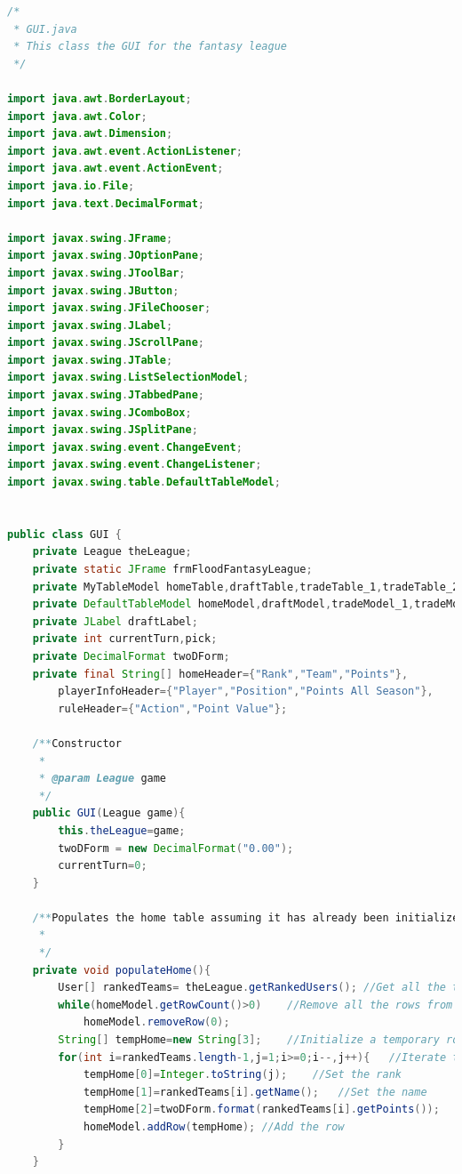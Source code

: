 \documentclass[12pt]{report}
\begin{document}
\begin{singlespace}
\begin{lstlisting}[language=Java,label=some-code,caption={GUI.java}]
/*
 * GUI.java
 * This class the GUI for the fantasy league
 */

import java.awt.BorderLayout;
import java.awt.Color;
import java.awt.Dimension;
import java.awt.event.ActionListener;
import java.awt.event.ActionEvent;
import java.io.File;
import java.text.DecimalFormat;

import javax.swing.JFrame;
import javax.swing.JOptionPane;
import javax.swing.JToolBar;
import javax.swing.JButton;
import javax.swing.JFileChooser;
import javax.swing.JLabel;
import javax.swing.JScrollPane;
import javax.swing.JTable;
import javax.swing.ListSelectionModel;
import javax.swing.JTabbedPane;
import javax.swing.JComboBox;
import javax.swing.JSplitPane;
import javax.swing.event.ChangeEvent;
import javax.swing.event.ChangeListener;
import javax.swing.table.DefaultTableModel;


public class GUI {
	private League theLeague;
	private static JFrame frmFloodFantasyLeague;
	private MyTableModel homeTable,draftTable,tradeTable_1,tradeTable_2,dropTable,ruleTable;
	private DefaultTableModel homeModel,draftModel,tradeModel_1,tradeModel_2,dropModel,ruleModel;
	private JLabel draftLabel;
	private int currentTurn,pick;
	private DecimalFormat twoDForm;
	private final String[] homeHeader={"Rank","Team","Points"},
		playerInfoHeader={"Player","Position","Points All Season"},
		ruleHeader={"Action","Point Value"};
	
	/**Constructor
	 * 
	 * @param League game
	 */
	public GUI(League game){
		this.theLeague=game;
		twoDForm = new DecimalFormat("0.00");
		currentTurn=0;
	}
	
	/**Populates the home table assuming it has already been initialized.
	 * 
	 */
	private void populateHome(){
		User[] rankedTeams= theLeague.getRankedUsers();	//Get all the teams in reverse ranked order
		while(homeModel.getRowCount()>0)	//Remove all the rows from the home table
			homeModel.removeRow(0);
		String[] tempHome=new String[3];	//Initialize a temporary row
		for(int i=rankedTeams.length-1,j=1;i>=0;i--,j++){	//Iterate through the teams
			tempHome[0]=Integer.toString(j);	//Set the rank
			tempHome[1]=rankedTeams[i].getName();	//Set the name
			tempHome[2]=twoDForm.format(rankedTeams[i].getPoints());	//Set the points
			homeModel.addRow(tempHome);	//Add the row
		}
	}
	

\end{lstlisting}
\end{singlespace}
\end{document}
